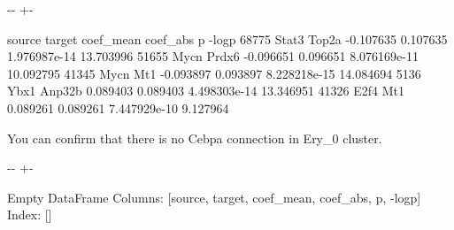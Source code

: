 \documentclass[letterpaper,10pt,english]{sphinxmanual}
\newlength\nbsphinxcodecellspacing
\begin{document}
{

\kern-\sphinxverbatimsmallskipamount\kern-\baselineskip
\kern+\FrameHeightAdjust\kern-\fboxrule
\vspace{\nbsphinxcodecellspacing}

\begin{sphinxVerbatim}[commandchars=\\\{\}]
\llap{\color{nbsphinxout}[39]:\,\hspace{\fboxrule}\hspace{\fboxsep}}      source  target  coef\_mean  coef\_abs             p      -logp
68775  Stat3   Top2a  -0.107635  0.107635  1.976987e-14  13.703996
51655   Mycn   Prdx6  -0.096651  0.096651  8.076169e-11  10.092795
41345   Mycn     Mt1  -0.093897  0.093897  8.228218e-15  14.084694
5136    Ybx1  Anp32b   0.089403  0.089403  4.498303e-14  13.346951
41326   E2f4     Mt1   0.089261  0.089261  7.447929e-10   9.127964
\end{sphinxVerbatim}
}

You can confirm that there is no Cebpa connection in Ery\_0 cluster.

{
\begin{sphinxVerbatim}[commandchars=\\\{\}]
\llap{\color{nbsphinxin}[41]:\,\hspace{\fboxrule}\hspace{\fboxsep}}\PYG{p}{[}  \PYG{p}{]}
\end{sphinxVerbatim}
}

{

\kern-\sphinxverbatimsmallskipamount\kern-\baselineskip
\kern+\FrameHeightAdjust\kern-\fboxrule
\vspace{\nbsphinxcodecellspacing}

\begin{sphinxVerbatim}[commandchars=\\\{\}]
\llap{\color{nbsphinxout}[41]:\,\hspace{\fboxrule}\hspace{\fboxsep}}Empty DataFrame
Columns: [source, target, coef\_mean, coef\_abs, p, -logp]
Index: []
\end{sphinxVerbatim}
}
\end{document}

